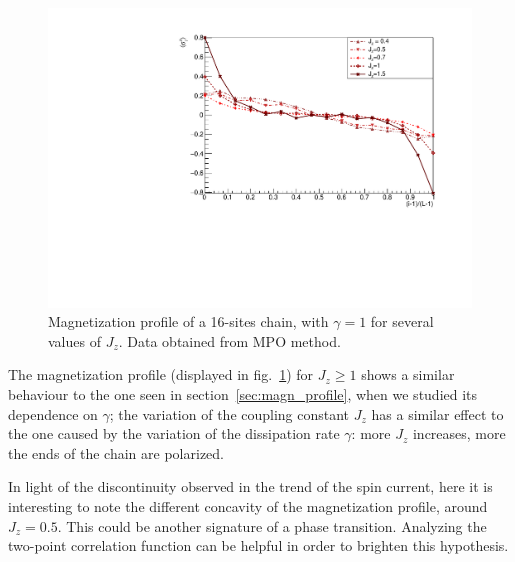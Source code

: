 
\begin{figure}[H]
    \centering
    \includegraphics[scale=0.75]{Figures/16sites/16sites_LMvsJz.pdf}
    \captionsetup{width=1.\linewidth}
    \caption{Magnetization profile of a 16-sites chain, with $\gamma = 1$ for several values of $J_z$. Data obtained from MPO method.}
    \label{fig:16sites_LMvsJz}
\end{figure}

The magnetization profile (displayed in fig.~\ref{fig:16sites_LMvsJz}) for $J_z \geq 1$ shows a similar behaviour to the one seen in section~\ref{sec:magn_profile}, when we studied its dependence on $\gamma$; the variation of the coupling constant $J_z$ has a similar effect to the one caused by the variation of the dissipation rate $\gamma$: more $J_z$ increases, more the ends of the chain are polarized.

In light of the discontinuity observed in the trend of the spin current, here it is interesting to note the different concavity of the magnetization profile, around $J_z = 0.5$. This could be another signature of a phase transition. Analyzing the two-point correlation function can be helpful in order to brighten this hypothesis.


